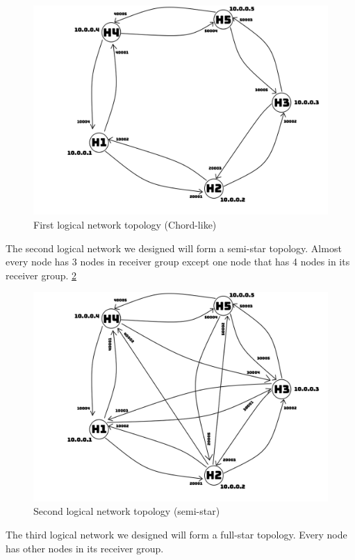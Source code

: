 \documentclass[a4paper, 12pt]{article}
\begin{document}
\begin{figure}[h]
\centering
   \includegraphics[scale=0.60]{conf2.png}
   \caption{First logical network topology (Chord-like)}
   \label{chord}
\end{figure}


The second logical network we designed will form a semi-star topology. Almost every node has 3 nodes in receiver group except one node that has 4 nodes in its receiver group. \ref{semi-star}


\begin{figure}[h]
\centering
   \includegraphics[scale=0.60]{conf3.png}
   \caption{Second logical network topology (semi-star)}
   \label{semi-star}
\end{figure}

The third logical network we designed will form a full-star topology. Every node has other nodes in its receiver group.
\end{document}
